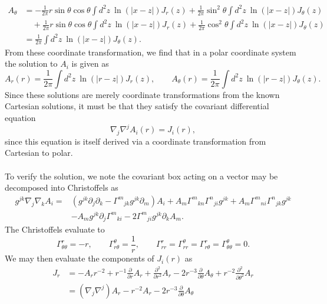 \documentclass[10pt,letterpaper]{article}
\begin{document}
\begin{align}
A_\theta &= -\frac{1}{2\pi} r\sin\theta\cos\theta  \int d^2z\ \ln(|x- z|) J_r(z) + \frac{1}{2\pi} \sin^2\theta \int d^2z\ \ln(|x- z|) J_\theta(z)\\
&\quad+ \frac{1}{2\pi}r\sin\theta\cos\theta \int d^2z\ \ln(|x- z|) J_r(z) + \frac{1}{2\pi}\cos^2\theta  \int d^2z\ \ln(|x- z|) J_\theta(z)\\
&= \frac{1}{2\pi}  \int d^2z\ \ln(|x- z|) J_\theta (z).
\end{align}
From these coordinate transformation, we find that in a polar coordinate system the solution to $A_i$ is given as
\begin{equation}
A_r(r) = \frac{1}{2\pi}  \int d^2z\ \ln(|r- z|) J_r (z),\qquad A_\theta(r)=\frac{1}{2\pi}  \int d^2z\ \ln(|r- z|) J_\theta (z).
\end{equation}
Since these solutions are merely coordinate transformations from the known Cartesian solutions, it must be that they satisfy the covariant differential equation 
\begin{equation}
\nabla_j \nabla^j A_i(r) = J_i(r),
\end{equation}
since this equation is itself derived via a coordinate transformation from Cartesian to polar. 
\\
\\
To verify the solution, we note the covariant box acting on a vector may be decomposed into Christoffels as
\begin{align}
g^{jk}\nabla_j \nabla_k A_i={}&\left( g^{jk} \partial_{j}\partial_{k}
-  \Gamma^{m}{}_{jk} g^{jk} \partial_{m}\right)A_{i}
+A_{m} \Gamma^{m}{}_{kn} \Gamma^{n}{}_{ji} g^{jk}
 + A_{m} \Gamma^{m}{}_{ni} \Gamma^{n}{}_{jk} g^{jk}
\nonumber\\
& -  A_{m} g^{jk} \partial_{j}\Gamma^{m}{}_{ki}
 -  2\Gamma^{m}{}_{ji} g^{jk} \partial_{k}A_{m}.
\end{align}
The Christoffels evaluate to
\begin{equation}
\Gamma^r_{\theta\theta} = -r,\qquad \Gamma^{\theta}_{r\theta} = \frac{1}{r},\qquad \Gamma^r_{rr} = \Gamma^\theta_{rr} = \Gamma^{r}_{r\theta} = \Gamma^{\theta}_{\theta\theta} = 0.
\end{equation}
We may then evaluate the components of $J_i(r)$ as 
\begin{align}
J_r &= - A_{r} r^{-2} + r^{-1} \frac{\partial}{\partial r}A_{r} + \frac{\partial^2}{\partial r^2}A_{r} - 2 r^{-3} \frac{\partial}{\partial \theta}A_{\theta} + r^{-2}  \frac{\partial^2}{\partial \theta^2}A_{r}\nonumber\\
&= (\nabla_j \nabla^j)A_r - r^{-2} A_r - 2r^{-3}\frac{\partial}{\partial \theta}A_\theta
\end{align}
\end{document}
